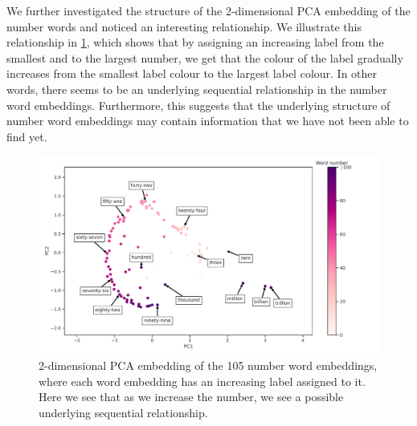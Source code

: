 We further investigated the structure of the 2-dimensional PCA embedding of the number words and noticed an interesting relationship. We illustrate this relationship in \cref{fig:ordered-number-word-embeddings-2d-pca}, which shows that by assigning an increasing label from the smallest and to the largest number, we get that the colour of the label gradually increases from the smallest label colour to the largest label colour. In other words, there seems to be an underlying sequential relationship in the number word embeddings. Furthermore, this suggests that the underlying structure of number word embeddings may contain information that we have not been able to find yet.
\begin{figure}[H]
    \centering
    \includegraphics[width=\textwidth]{thesis/figures/ordered-number-word-embeddings-2d-pca.pdf}
    \caption{2-dimensional PCA embedding of the 105 number word embeddings, where each word embedding has an increasing label assigned to it. Here we see that as we increase the number, we see a possible underlying sequential relationship.}
    \label{fig:ordered-number-word-embeddings-2d-pca}
\end{figure}